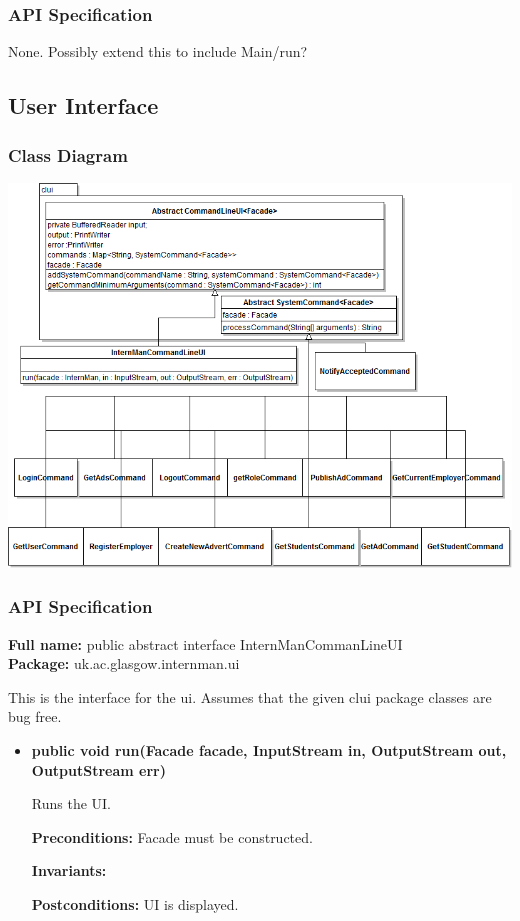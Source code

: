 \documentclass[11pt]{article}
\begin{document}
\subsubsection{API Specification}

None. Possibly extend this to include Main/run?

\newpage

\subsection{User Interface}

\subsubsection{Class Diagram}

\includegraphics[scale=0.65,angle=90]{UIClassDiagram.png}

\subsubsection{API Specification}

\textbf{Full name:} public abstract interface InternManCommanLineUI\\

\textbf{Package:} uk.ac.glasgow.internman.ui

This is the interface for the ui. Assumes that the given clui package classes
are bug free.

\begin{itemize}

\item{\textbf{public void run(Facade facade, InputStream in, OutputStream out,
			OutputStream err)}

Runs the UI.

\textbf{Preconditions:} Facade must be constructed.

\textbf{Invariants:}

\textbf{Postconditions:} UI is displayed.}

\end{itemize}
\end{document}
